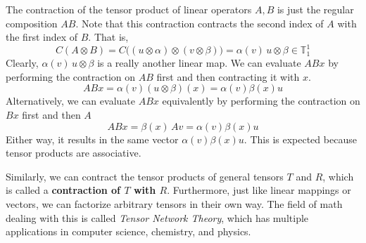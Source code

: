   \begin{proposition}
  The contraction of the tensor product of linear operators $A, B$ is just the regular composition $A B$. Note that this contraction contracts the second index of $A$ with the first index of $B$. That is, 
  \[C(A \otimes B) = C\big( (u \otimes \alpha) \otimes (v \otimes \beta) \big) = \alpha(v) \, u \otimes \beta \in \mathbb{T}^1_1\]
  Clearly, $\alpha(v) \, u \otimes \beta$ is a really another linear map. We can evaluate $A B x$ by performing the contraction on $A B$ first and then contracting it with $x$. 
  \[A B x = \alpha (v) (u \otimes \beta) (x) = \alpha (v) \beta(x) u \]
  Alternatively, we can evaluate $A B x$ equivalently by performing the contraction on $B x$ first and then $A$ 
  \[A B x = \beta (x)\, A v = \alpha(v) \beta(x) u\]
  Either way, it results in the same vector $\alpha (v) \beta (x) u$. This is expected because tensor products are associative. 
  \end{proposition}

  Similarly, we can contract the tensor products of general tensors $T$ and $R$, which is called a \textbf{contraction of $T$ with $R$}. Furthermore, just like linear mappings or vectors, we can factorize arbitrary tensors in their own way. The field of math dealing with this is called \textit{Tensor Network Theory}, which has multiple applications in computer science, chemistry, and physics. 

